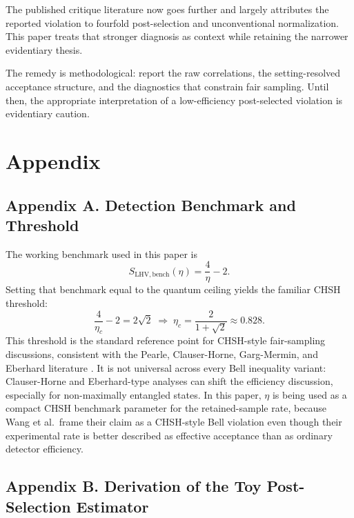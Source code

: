 \documentclass[11pt]{article}
\begin{document}
The published critique literature now goes further and largely attributes the reported violation to fourfold post-selection and unconventional normalization. This paper treats that stronger diagnosis as context while retaining the narrower evidentiary thesis.

The remedy is methodological: report the raw correlations, the setting-resolved acceptance structure, and the diagnostics that constrain fair sampling. Until then, the appropriate interpretation of a low-efficiency post-selected violation is evidentiary caution.

\section{Appendix}

\subsection{Appendix A. Detection Benchmark and Threshold}

The working benchmark used in this paper is
\[
S_{\mathrm{LHV,bench}}(\eta) = \frac{4}{\eta} - 2.
\]
Setting that benchmark equal to the quantum ceiling yields the familiar CHSH threshold:
\[
\frac{4}{\eta_c} - 2 = 2\sqrt{2} \;\Longrightarrow\; \eta_c = \frac{2}{1+\sqrt{2}} \approx 0.828.
\]
This threshold is the standard reference point for CHSH-style fair-sampling discussions, consistent with the Pearle, Clauser-Horne, Garg-Mermin, and Eberhard literature \cite{pearle1970,eberhard1993,clauserhorne1974,gargmermin1987}. It is not universal across every Bell inequality variant: Clauser-Horne and Eberhard-type analyses can shift the efficiency discussion, especially for non-maximally entangled states. In this paper, $\eta$ is being used as a compact CHSH benchmark parameter for the retained-sample rate, because Wang et al.~frame their claim as a CHSH-style Bell violation even though their experimental rate is better described as effective acceptance than as ordinary detector efficiency.

\subsection{Appendix B. Derivation of the Toy Post-Selection Estimator}
\end{document}
